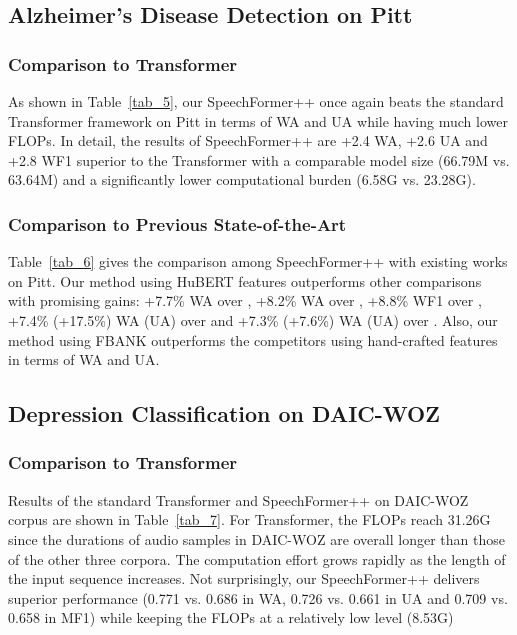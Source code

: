 \documentclass[lettersize,journal]{IEEEtran}
\begin{document}
\subsection{Alzheimer's Disease Detection on Pitt}
\subsubsection{Comparison to Transformer} As shown in Table~\ref{tab_5}, our SpeechFormer++ once again beats the standard Transformer framework on Pitt in terms of WA and UA while having much lower FLOPs. In detail, the results of SpeechFormer++ are +2.4 WA, +2.6 UA and +2.8 WF1 superior to the Transformer with a comparable model size (66.79M vs. 63.64M) and a significantly lower computational burden (6.58G vs. 23.28G).

\subsubsection{Comparison to Previous State-of-the-Art} Table~\ref{tab_6} gives the comparison among SpeechFormer++ with existing works on Pitt. Our method using HuBERT features outperforms other comparisons with promising gains: +7.7\% WA over \cite{GCNN}, +8.2\% WA over \cite{Makiuchi}, +8.8\% WF1 over \cite{pitt_use_w2v2}, +7.4\% (+17.5\%) WA (UA) over \cite{Autoencoder} and +7.3\% (+7.6\%) WA (UA) over \cite{Monica}. Also, our method using FBANK outperforms the competitors using hand-crafted features in terms of WA and UA.

\subsection{Depression Classification on DAIC-WOZ}

\subsubsection{Comparison to Transformer} Results of the standard Transformer and SpeechFormer++ on DAIC-WOZ corpus are shown in Table~\ref{tab_7}. For Transformer, the FLOPs reach 31.26G since the durations of audio samples in DAIC-WOZ are overall longer than those of the other three corpora. The computation effort grows rapidly as the length of the input sequence increases. Not surprisingly, our SpeechFormer++ delivers superior performance (0.771 vs. 0.686 in WA, 0.726 vs. 0.661 in UA and 0.709 vs. 0.658 in MF1) while keeping the FLOPs at a relatively low level (8.53G)
\end{document}
